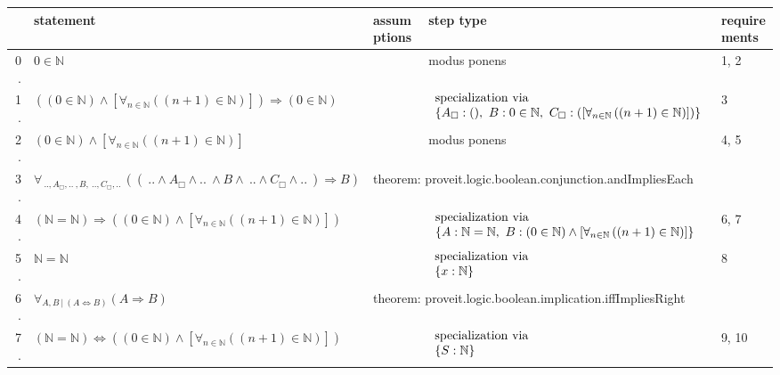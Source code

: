 \documentclass{article}
\begin{document}
\begin{tabular}{rl|l|l|l}
 & \textbf{statement} & \textbf{assumptions} & \textbf{step type} & \textbf{requirements} \\
\hline
0. & $0 \in \mathbb{N}$ &  & modus ponens & 1, 2 \\
\hline
1. & $\left( \left(0 \in \mathbb{N}\right) \land \left[\forall_{ n  \in \mathbb{N}} \left(\left( n + 1 \right) \in \mathbb{N}\right)\right] \right) \Rightarrow \left(0 \in \mathbb{N}\right)$ &  & $\begin{array}{l} {\rm specialization~via} \\ \left\{A_{\Box}: (),~B: 0 \in \mathbb{N},~C_{\Box}: \left( \left[\forall_{ n  \in \mathbb{N}} \left(\left( n + 1 \right) \in \mathbb{N}\right)\right] \right)\right\}\end{array}$ & 3 \\
\hline
2. & $ \left(0 \in \mathbb{N}\right) \land \left[\forall_{ n  \in \mathbb{N}} \left(\left( n + 1 \right) \in \mathbb{N}\right)\right] $ &  & modus ponens & 4, 5 \\
\hline
3. & $\forall_{~.., A_{\Box} ,..~, B ,~.., C_{\Box} ,..~} \left(\left(~..\land A_{\Box} \land..~\land B \land~..\land C_{\Box} \land..~\right) \Rightarrow B\right)$ & \multicolumn{3}{|l}{theorem: proveit.logic.boolean.conjunction.andImpliesEach} \\
\hline
4. & $\left(\mathbb{N} = \mathbb{N}\right) \Rightarrow \left( \left(0 \in \mathbb{N}\right) \land \left[\forall_{ n  \in \mathbb{N}} \left(\left( n + 1 \right) \in \mathbb{N}\right)\right] \right)$ &  & $\begin{array}{l} {\rm specialization~via} \\ \left\{A: \mathbb{N} = \mathbb{N},~B:  \left(0 \in \mathbb{N}\right) \land \left[\forall_{ n  \in \mathbb{N}} \left(\left( n + 1 \right) \in \mathbb{N}\right)\right] \right\}\end{array}$ & 6, 7 \\
\hline
5. & $\mathbb{N} = \mathbb{N}$ &  & $\begin{array}{l} {\rm specialization~via} \\ \left\{x: \mathbb{N}\right\}\end{array}$ & 8 \\
\hline
6. & $\forall_{ A , B ~|~ \left(A \Leftrightarrow B\right) } \left(A \Rightarrow B\right)$ & \multicolumn{3}{|l}{theorem: proveit.logic.boolean.implication.iffImpliesRight} \\
\hline
7. & $\left(\mathbb{N} = \mathbb{N}\right) \Leftrightarrow \left( \left(0 \in \mathbb{N}\right) \land \left[\forall_{ n  \in \mathbb{N}} \left(\left( n + 1 \right) \in \mathbb{N}\right)\right] \right)$ &  & $\begin{array}{l} {\rm specialization~via} \\ \left\{S: \mathbb{N}\right\}\end{array}$ & 9, 10 \\

\end{tabular}
\end{document}
